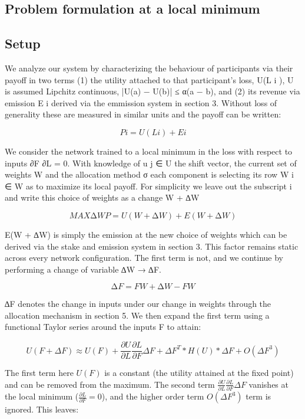 \documentclass{article}
\begin{document}
\subsection{Problem formulation at a local minimum}

\subsection{Setup}

We analyze our system by characterizing the behaviour of participants via their payoﬀ in two terms (1) the utility attached to that participant’s loss, U(L i ), U is assumed Lipchitz continuous, |U(a) − U(b)| ≤ α(a − b), and (2) its revenue via emission E i derived via the emmission system in section 3. Without loss of generality these are measured in similar units and the payoﬀ can be written:

\[P i = U(L i ) + E i \]

We consider the network trained to a local minimum in the loss with respect to inputs ∂F ∂L = 0. With knowledge of u j ∈ U the shift vector, the current set of weights W and the allocation method σ each component is selecting its row W i ∈ W as to maximize its local payoﬀ. For simplicity we leave out the subscript i and write this choice of weights as a change W + ∆W
\bigskip

\[MAX ∆W P = U(W + ∆W) + E(W + ∆W) \]

E(W + ∆W) is simply the emission at the new choice of weights which can be derived via the stake and emission system in section 3. This factor remains static across every network conﬁguration. The ﬁrst term is not, and we continue by performing a change of variable ∆W → ∆F.
\bigskip


\[∆F = F W +∆W − F W \]


∆F denotes the change in inputs under our change in weights through the allocation mechanism in section 5. We then expand the ﬁrst term using a functional Taylor series around the inputs F to attain:
\bigskip

\[ U(F + \Delta F) \approx U(F) + \frac{\partial U}{\partial L}\frac{\partial L}{\partial F} \Delta F  + \Delta F^T * H(U) * \Delta F + O(\Delta F^3)\]
\bigskip

The first term here $U(F)$ is a constant (the utility attained at the fixed point) and can be removed from the maximum. The second term $\frac{\partial U}{\partial L}\frac{\partial L}{\partial F} \Delta F$ vanishes at the local minimum ($\frac{\partial L}{\partial F} = 0$), and the higher order term $O(\Delta F^3)$ term is ignored. This leaves:
\bigskip
\end{document}
